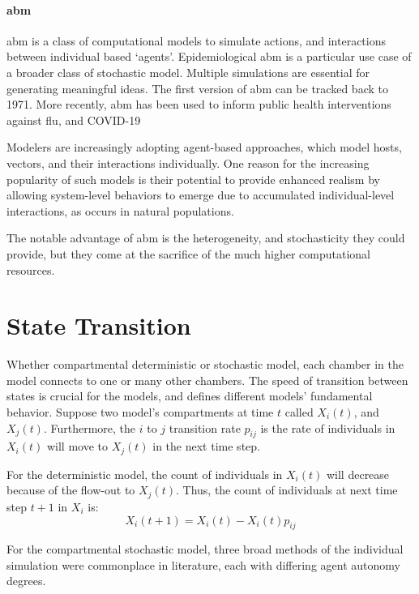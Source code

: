\documentclass[a4paper, 12pt, twoside]{report}
\begin{document}
\paragraph{\gls{abm}}
\gls{abm} is a class of computational models to simulate actions, and interactions between individual based `agents'.
Epidemiological \gls{abm} is a particular use case of a broader class of stochastic model.
Multiple simulations are essential for generating meaningful ideas.
The first version of \gls{abm} can be tracked back to 1971\cite{Schelling1971}.
More recently, \gls{abm} has been used to inform public health interventions against flu\cite{Ferguson2006a, Ferguson2005}, and COVID-19\cite{Maziarz2020, Ferguson2020, Chang2020}

Modelers are increasingly adopting agent-based approaches, which model hosts, vectors, and their interactions individually.
One reason for the increasing popularity of such models is their potential to provide enhanced realism by allowing system-level behaviors to emerge due to accumulated individual-level interactions, as occurs in natural populations.

The notable advantage of \gls{abm} is the heterogeneity, and stochasticity they could provide, but they come at the sacrifice of the much higher computational resources.

\section{State Transition}
Whether compartmental deterministic or stochastic model, each chamber in the model connects to one or many other chambers.
The speed of transition between states is crucial for the models, and defines different models’ fundamental behavior.
Suppose two model's compartments at time $t$ called $X_i(t)$, and $X_j(t)$.
Furthermore, the $i$ to  $j$ transition rate  $p_{ij}$ is the rate of individuals in $X_i(t)$ will move to $X_j(t)$ in the next time step.

For the deterministic model, the count of individuals in $X_i(t)$ will decrease because of the flow-out to $X_j(t)$.
Thus, the count of individuals at next time step $t+1$ in $X_i$ is:
\begin{equation}
	X_i(t+1) = X_i(t) - X_i(t)p_{ij}
\end{equation}

For the compartmental stochastic model, three broad methods of the individual simulation were commonplace in literature, each with differing agent autonomy degrees.
\end{document}
